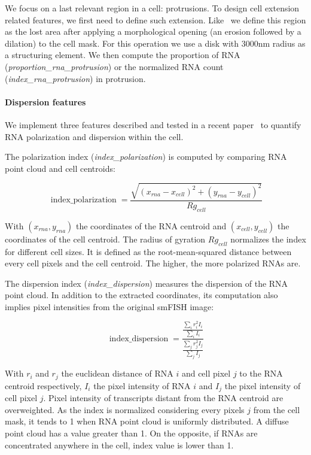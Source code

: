 We focus on a last relevant region in a cell: protrusions.
To design cell extension related features, we first need to define such extension.
Like~\cite{samacoits_computational_2018} we define this region as the lost area after applying a morphological opening (an erosion followed by a dilation) to the cell mask.
For this operation we use a disk with 3000nm radius as a structuring element.
We then compute the proportion of \ac{RNA} (\emph{proportion\_rna\_protrusion}) or the normalized \ac{RNA} count (\emph{index\_rna\_protrusion}) in protrusion.

\paragraph{Dispersion features}

We implement three features described and tested in a recent paper~\cite{stueland_rdi_2019} to quantify \ac{RNA} polarization and dispersion within the cell.

The polarization index (\emph{index\_polarization}) is computed by comparing \ac{RNA} point cloud and cell centroids:

\begin{equation}
	{\displaystyle \operatorname{index\_polarization} = \frac{\sqrt{(x_{rna} - x_{cell})^2 + (y_{rna} - y_{cell})^2}}{Rg_{cell}}}
\end{equation}

\noindent
With $(x_{rna}, y_{rna})$ the coordinates of the \ac{RNA} centroid and $(x_{cell}, y_{cell})$ the coordinates of the cell centroid.
The radius of gyration $Rg_{cell}$ normalizes the index for different cell sizes.
It is defined as the root-mean-squared distance between every cell pixels and the cell centroid.
The higher, the more polarized \ac{RNA}s are.

The dispersion index (\emph{index\_dispersion}) measures the dispersion of the \ac{RNA} point cloud.
In addition to the extracted coordinates, its computation also implies pixel intensities from the original \ac{smFISH} image:

\begin{equation}
	{\displaystyle \operatorname{index\_dispersion} = \frac{\frac{\sum_{i} r_i^2 I_i}{\sum_{i} I_i}}{\frac{\sum_{j} r_j^2 I_j}{\sum_{j} I_j}}}
\end{equation}

\noindent
With $r_i$ and $r_j$ the euclidean distance of \ac{RNA} $i$ and cell pixel $j$ to the \ac{RNA} centroid respectively, $I_i$ the pixel intensity of \ac{RNA} $i$ and $I_j$ the pixel intensity of cell pixel $j$.
Pixel intensity of transcripts distant from the \ac{RNA} centroid are overweighted.
As the index is normalized considering every pixels $j$ from the cell mask, it tends to 1 when \ac{RNA} point cloud is uniformly distributed.
A diffuse point cloud has a value greater than 1.
On the opposite, if \ac{RNA}s are concentrated anywhere in the cell, index value is lower than 1.

